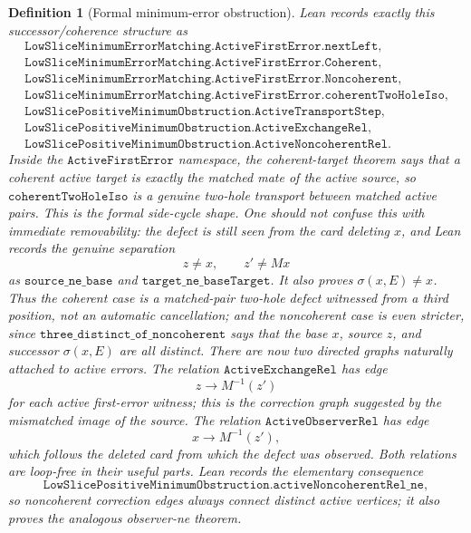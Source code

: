 \documentclass[11pt]{article}
\newtheorem{definition}{Definition}
\begin{document}
\begin{definition}[Formal minimum-error obstruction]
Lean records exactly this successor/coherence structure as
\[
\begin{array}{l}
\texttt{LowSliceMinimumErrorMatching.ActiveFirstError.nextLeft},\\
\texttt{LowSliceMinimumErrorMatching.ActiveFirstError.Coherent},\\
\texttt{LowSliceMinimumErrorMatching.ActiveFirstError.Noncoherent},\\
\texttt{LowSliceMinimumErrorMatching.ActiveFirstError.coherentTwoHoleIso},\\
\texttt{LowSlicePositiveMinimumObstruction.ActiveTransportStep},\\
\texttt{LowSlicePositiveMinimumObstruction.ActiveExchangeRel},\\
\texttt{LowSlicePositiveMinimumObstruction.ActiveNoncoherentRel}.
\end{array}
\]
Inside the \(\texttt{ActiveFirstError}\) namespace, the coherent-target theorem
says that a coherent active target is exactly the matched mate of the active
source, so \(\texttt{coherentTwoHoleIso}\) is a genuine two-hole transport
between matched active pairs.  This is the formal side-cycle shape.
One should not confuse this with immediate removability: the defect is still
seen from the card deleting \(x\), and Lean records the genuine separation
\[
  z\neq x,\qquad z'\neq Mx
\]
as \(\texttt{source\_ne\_base}\) and \(\texttt{target\_ne\_baseTarget}\).
It also proves \(\sigma(x,E)\neq x\).  Thus the coherent case is a matched-pair
two-hole defect witnessed from a third position, not an automatic cancellation;
and the noncoherent case is even stricter, since
\(\texttt{three\_distinct\_of\_noncoherent}\) says that the base \(x\), source
\(z\), and successor \(\sigma(x,E)\) are all distinct.
There are now two directed graphs naturally attached to active errors.  The
relation \(\texttt{ActiveExchangeRel}\) has edge
\[
  z\longrightarrow M^{-1}(z')
\]
for each active first-error witness; this is the correction graph suggested by
the mismatched image of the source.  The relation
\(\texttt{ActiveObserverRel}\) has edge
\[
  x\longrightarrow M^{-1}(z'),
\]
which follows the deleted card from which the defect was observed.  Both
relations are loop-free in their useful parts.  Lean records the elementary
consequence
\[
  \texttt{LowSlicePositiveMinimumObstruction.activeNoncoherentRel\_ne},
\]
so noncoherent correction edges always connect distinct active vertices; it
also proves the analogous observer-ne theorem.


\end{definition}
\end{document}
